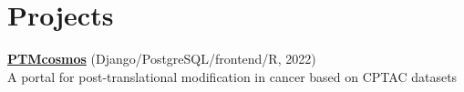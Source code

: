 \section{Projects}

\begin{multicols}{2}
    \begin{compactentrylist}
        \item \href{https://ptmcosmos.wustl.edu/}{\textbf{PTMcosmos}}
            (Django/PostgreSQL/frontend/R, 2022) \\
            A portal for post-translational modification in cancer based on CPTAC datasets
    \end{compactentrylist}
\end{multicols}
